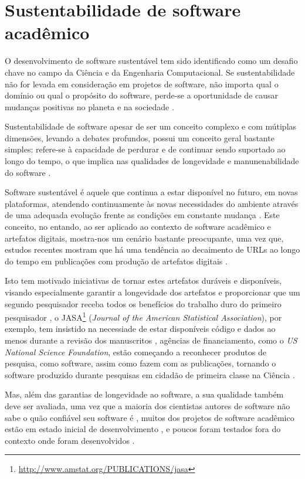 \section{Sustentabilidade de software acadêmico}

O desenvolvimento de software sustentável tem sido identificado como um desafio
chave no campo da Ciência e da Engenharia Computacional.
Se sustentabilidade
não for levada em consideração em projetos de software, não importa qual o
domínio ou qual o propósito do software, perde-se a oportunidade de causar
mudanças positivas no planeta e na sociedade \cite{becker2014karlskrona}.

Sustentabilidade de software apesar de ser um conceito complexo e com mútiplas dimensões,
levando a debates profundos, possui um conceito geral bastante simples: refere-se à
capacidade de perdurar e de continuar sendo suportado ao longo do tempo, o que 
implica nas qualidades de longevidade e manunenabilidade do software
\cite{venters2014software}.

Software sustentável é aquele que continua a estar disponível no futuro, em
novas plataformas, atendendo continuamente às novas necessidades do ambiente
através de uma adequada evolução frente as condições em constante mudança
\cite{allen2017engineering}. Este conceito, no entando, ao ser aplicado ao
contexto de software acadêmico e artefatos digitais, mostra-nos um cenário
bastante preocupante, uma vez que, estudos recentes mostram que há uma tendência
ao decaimento de URLs ao longo do tempo em publicações com produção de
artefatos digitais \cite{wren2017use}.

Isto tem motivado iniciativas de tornar estes artefatos duráveis e disponíveis,
visando especialmente garantir a longevidade dos artefatos e proporcionar que
um segundo pesquisador receba todos os benefícios do trabalho duro do primeiro
pesquisador \cite{king1995replication},
o JASA\footnote{\url{http://www.amstat.org/PUBLICATIONS/jasa}} ({\it Journal of the American Statistical Association}), por
exemplo, tem insistido na necessiade de estar disponíveis código e dados ao
menos durante a revisão dos manuscritos \cite{baker2016scientists}, agências de
financiamento, como o {\it US National Science Foundation}, estão começando a
reconhecer produtos de pesquisa, como software, assim como fazem com as
publicações, tornando o software produzido durante pesquisas em cidadão de primeira
classe na Ciência \cite{allen2017engineering}.

Mas, além das garantias de longevidade ao software, a sua qualidade também deve
ser avaliada,
uma vez que
a maioria dos cientistas autores
de software não sabe o quão confiável seu software é
\cite{merali2010computational}, muitos dos projetos de software acadêmico estão
em estado inicial de desenvolvimento \cite{marshall2013tools}, e poucos foram
testados fora do contexto onde foram desenvolvidos \cite{portillo2012tools}.

